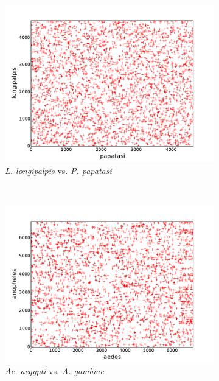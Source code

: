 \begin{figure}[H]
  \centering
  \begin{subfigure}[b]{0.45\textwidth}
    \includegraphics[width=\textwidth]{figures/synteny/papatasi_longipalpis_plot}
    \caption{\emph{L. longipalpis} vs. \emph{P. papatasi}}
    \label{fig:synteny-dotplots-sandflies}
  \end{subfigure}
  ~
  \begin{subfigure}[b]{0.45\textwidth}
    \includegraphics[width=\textwidth]{figures/synteny/aedes_anopheles_plot}
    \caption{\emph{Ae. aegypti} vs. \emph{A. gambiae}}
    \label{fig:synteny-dotplots-mosquitoes}
  \end{subfigure}
  ~
  \begin{subfigure}[b]{0.45\textwidth}

\end{subfigure}
\end{figure}

